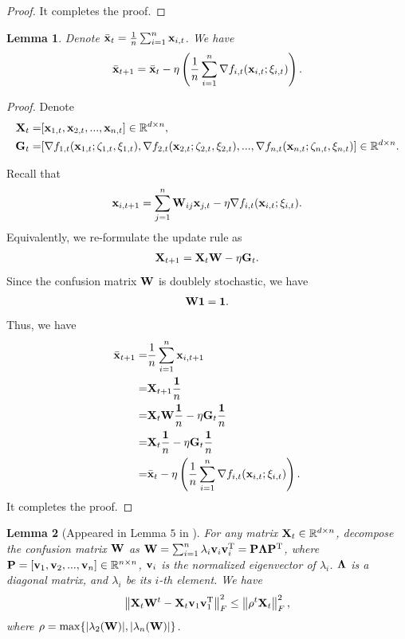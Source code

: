 \documentclass{article}
\newtheorem{Lemma}{\bf{Lemma}}
\begin{document}
\begin{proof}
It completes the proof.
\end{proof}


\begin{Lemma}
\label{lemma_average_update_rule}
Denote $\bar{{\bf x}}_t = \frac{1}{n}\sum_{i=1}^n {\bf x}_{i,t}$. We have
\begin{align}
\nonumber
\bar{{\bf x}}_{t+1} =  \bar{{\bf x}}_{t} - \eta \left( \frac{1}{n} \sum_{i=1}^n \nabla f_{i,t}({\bf x}_{i,t};\xi_{i,t}) \right). 
\end{align}
\end{Lemma}
\begin{proof}
Denote 
\begin{align}
\nonumber
{\bf X}_t = &  [{\bf x}_{1,t}, {\bf x}_{2,t}, ..., {\bf x}_{n,t}] \in \mathbb{R}^{d\times n}, \\ \nonumber
{\bf G}_t = & [\nabla f_{1,t}({\bf x}_{1,t};\zeta_{1,t},\xi_{1,t}), \nabla f_{2,t}({\bf x}_{2,t};\zeta_{2,t},\xi_{2,t}), ..., \nabla f_{n,t}({\bf x}_{n,t};\zeta_{n,t},\xi_{n,t})] \in \mathbb{R}^{d\times n}.
\end{align}

Recall that 
\begin{align}
\nonumber
{\bf x}_{i,t+1} = \sum_{j=1}^n {\bf W}_{ij}{\bf x}_{j,t} - \eta \nabla f_{i,t}({\bf x}_{i,t};\xi_{i,t}).
\end{align} Equivalently, we re-formulate the update rule as
\begin{align}
\nonumber
{\bf X}_{t+1} = {\bf X}_{t}{\bf W} - \eta {\bf G}_t.
\end{align} Since the confusion matrix ${\bf W}$ is doublely stochastic, we have
\begin{align}
\nonumber
{\bf W} {\bf 1} = {\bf 1}.
\end{align} Thus, we have
\begin{align}
\nonumber
\bar{{\bf x}}_{t+1} = & \frac{1}{n}\sum_{i=1}^n {\bf x}_{i,t+1} \\ \nonumber
= & {\bf X}_{t+1}\frac{{\bf 1}}{n} \\ \nonumber 
= & {\bf X}_{t}{\bf W}\frac{{\bf 1}}{n} - \eta {\bf G}_t\frac{{\bf 1}}{n} \\ \nonumber
= & {\bf X}_{t}\frac{{\bf 1}}{n} - \eta {\bf G}_t\frac{{\bf 1}}{n} \\ \nonumber
=& \bar{{\bf x}}_{t} - \eta \left( \frac{1}{n} \sum_{i=1}^n \nabla f_{i,t}({\bf x}_{i,t};\xi_{i,t}) \right). 
\end{align} It completes the proof.
\end{proof}

\begin{Lemma}[Appeared in Lemma $5$ in \citep{Tang:2018un}]
\label{lemma_hanlin_1}
For any matrix ${\bf X}_t\in\mathbb{R}^{d\times n}$, decompose the confusion matrix ${\bf W}$ as ${\bf W} = \sum_{i=1}^n \lambda_i {\bf v}_i {\bf v}_i^{\rm T} = {\bf P} \mathbf{\Lambda} {\bf P}^{\rm T}$, where ${\bf P} = [{\bf v}_1, {\bf v}_2, ..., {\bf v}_n]\in\mathbb{R}^{n\times n}$, ${\bf v}_i$ is the normalized eigenvector of $\lambda_i$. $\mathbf{\Lambda}$ is a diagonal matrix, and $\lambda_i$ be its $i$-th element. We have
\begin{align}
\nonumber
\left\lVert{\bf X}_t {\bf W}^t - {\bf X}_t {\bf v}_1 {\bf v}_1^{\rm T} \right\rVert_F^2 \le \left\lVert\rho^t {\bf X}_t\right\rVert_F^2, 
\end{align} where  $\rho = \max \{| \lambda_2({\bf W}) |, | \lambda_n({\bf W}) |\}$. 

\end{Lemma}
\end{document}
